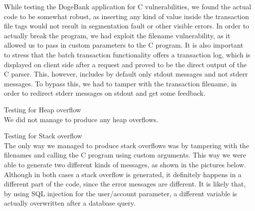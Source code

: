While testing the DogeBank application for C vulnerabilities, we found the actual code to be somewhat robust, as inserting any kind of value inside the transaction file tags would not result in segmentation fault or other visible errors. In order to actually break the program, we had exploit the filename vulnerability, as it allowed us to pass in custom parameters to the C program. It is also important to stress that the batch transaction functionality offers a transaction log, which is displayed on client side after a request and proved to be the direct output of the C parser. This, however, includes by default only stdout messages and not stderr messages. To bypass this, we had to tamper with the transaction filename, in order to redirect stderr messages on stdout and get some feedback.\newline

Testing for Heap overflow\\
We did not manage to produce any heap overflows.

Testing for Stack overflow\\
The only way we managed to produce stack overflows was by tampering with the filenames and calling the C program using custom arguments. This way we were able to generate two different kinds of messages, as shown in the pictures below. Although in both cases a stack overflow is generated, it definitely happens in a different part of the code, since the error messages are different. It is likely that, by using SQL injection for the user/account parameter, a different variable is actually overwritten after a database query.

